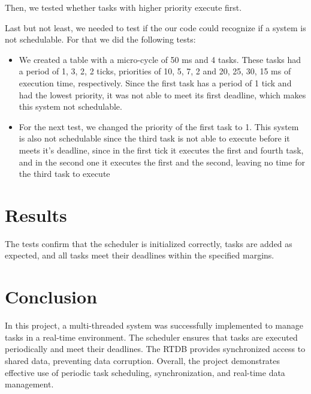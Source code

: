 \documentclass[a4paper,12pt]{article}
\begin{document}
Then, we tested whether tasks with higher priority execute first.

Last but not least, we needed to test if the our code could recognize if a system is not schedulable. For that we did the following tests:
\begin{itemize}
    \item We created a table with a micro-cycle of 50 ms and 4 tasks. These tasks had a period of 1, 3, 2, 2 ticks, priorities of 10, 5, 7, 2 and 20, 25, 30, 15 ms of execution time, respectively. Since the first task has a period of 1 tick and had the lowest priority, it was not able to meet its first deadline, which makes this system not schedulable.

    \item For the next test, we changed the priority of the first task to 1. This system is also not schedulable since the third task is not able to execute before it meets it's deadline, since in the first tick it executes the first and fourth task, and in the second one it executes the first and the second, leaving no time for the third task to execute


\end{itemize}
\section{Results}
The tests confirm that the scheduler is initialized correctly, tasks are added as expected, and all tasks meet their deadlines within the specified margins.

\section{Conclusion}
In this project, a multi-threaded system was successfully implemented to manage tasks in a real-time environment. The scheduler ensures that tasks are executed periodically and meet their deadlines. The RTDB provides synchronized access to shared data, preventing data corruption. Overall, the project demonstrates effective use of periodic task scheduling, synchronization, and real-time data management.
\end{document}

